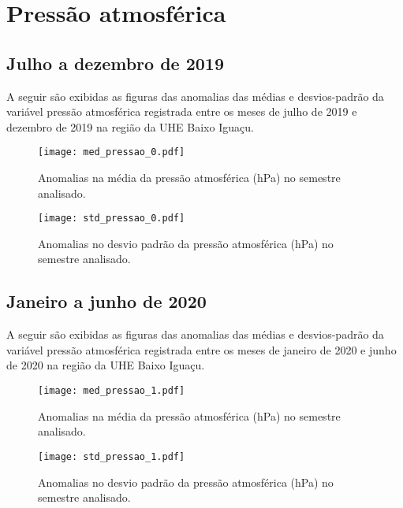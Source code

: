 \documentclass[a4paper,12pt]{article}
\begin{document}
        \newpage

        \section{Pressão atmosférica }
        \subsection{Julho a dezembro de 2019}
        \hspace{0.5cm} A seguir são exibidas as figuras das anomalias das médias e desvios-padrão da variável pressão atmosférica
        registrada entre os meses de julho de 2019 e dezembro de 2019 na região da UHE Baixo Iguaçu.

        \begin{figure}[!htb]
        \centering
        \texttt{[image: med\_pressao\_0.pdf]}
        \caption{Anomalias na média da pressão atmosférica (hPa) no semestre analisado.}
        \label{fig:figmed_pressao_0}
        \end{figure}

        \begin{figure}[!htb]
        \centering
        \texttt{[image: std\_pressao\_0.pdf]}
        \caption{Anomalias no desvio padrão da pressão atmosférica (hPa) no semestre analisado.}
        \label{fig:figstd_pressao_0}
        \end{figure}

        \newpage
        \subsection{Janeiro a junho de 2020}
        \hspace{0.5cm} A seguir são exibidas as figuras das anomalias das médias e desvios-padrão da variável pressão atmosférica
        registrada entre os meses de janeiro de 2020 e junho de 2020 na região da UHE Baixo Iguaçu.

        \begin{figure}[!htb]
        \centering
        \texttt{[image: med\_pressao\_1.pdf]}
        \caption{Anomalias na média da pressão atmosférica (hPa) no semestre analisado.}
        \label{fig:figmed_pressao_1}
        \end{figure}

        \begin{figure}[!htb]
        \centering
        \texttt{[image: std\_pressao\_1.pdf]}
        \caption{Anomalias no desvio padrão da pressão atmosférica (hPa) no semestre analisado.}
        \label{fig:figstd_pressao_1}
        \end{figure}
\end{document}
